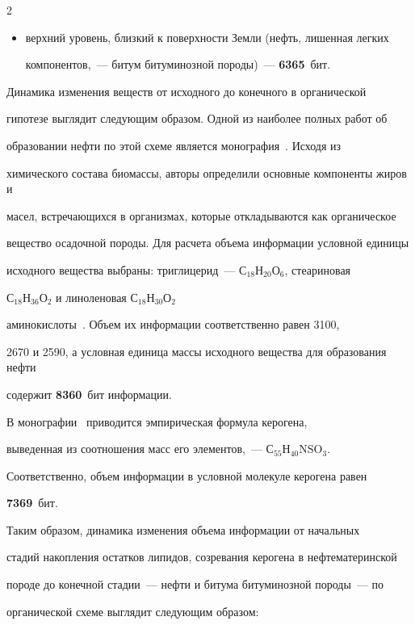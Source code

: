 \begin{multicols}{2}
\begin{itemize}
\textbf{6171}~бит; 

\item верхний уровень, близкий к поверхности Земли (нефть, лишенная легких 

компонентов,~--- битум битуминозной породы)~--- \textbf{6365}~бит. 

     \end{itemize}

     

     Динамика изменения веществ от исходного до конечного в органической 

гипотезе выглядит следующим образом. Одной из наиболее полных работ об 

образовании нефти по этой схеме является монография~\cite{34s}. Исходя из 

химического состава биомассы, авторы определили основные компоненты жиров и 

масел, встречающихся в организмах, которые откладываются как органическое 

вещество осадочной породы. Для расчета объема информации условной единицы 

исходного вещества выбраны: триглицерид~--- С$_{18}$Н$_{20}$О$_6$, стеариновая 

С$_{18}$Н$_{36}$О$_2$ и линоленовая С$_{18}$Н$_{30}$О$_2$ 

аминокислоты~\cite{34s, 13s}. Объем их информации соответственно равен 3100, 

2670 и 2590, а условная единица массы исходного вещества для образования нефти 

содержит \textbf{8360}~бит информации. 

     

     В монографии~\cite{4s} приводится эмпирическая формула керогена, 

выведенная из соотношения масс его элементов,~--- С$_{55}$Н$_{40}$NSO$_3$. 

Соответственно, объем информации в условной молекуле керогена равен 

\textbf{7369}~бит.

     

     Таким образом, динамика изменения объема информации от начальных 

стадий накопления остатков липидов, созревания керогена в нефтематеринской 

породе до конечной стадии~--- нефти и битума битуминозной породы~--- по 

органической схеме выглядит следующим образом: 


\end{multicols}
